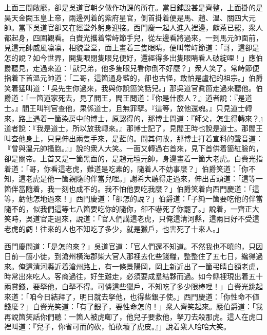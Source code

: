 上面三間敞廳，卻是吳道官朝夕做作功課的所在。當日鋪設甚是齊整，上面掛的是昊天金闕玉皇上帝，兩邊列着的紫府星官，側首掛着便是馬、趙、溫、關四大元帥。{}當下吳道官卻又在經堂外躬身迎接。西門慶一起人進入裡邊，獻茶已罷，衆人都起身，四圍觀看。白賚光攜着常峙節手兒，從左邊看將過來，一到馬元帥面前，見這元帥威風凜凜，相貌堂堂，面上畫着三隻眼睛，便叫常峙節道：「哥，這卻是怎的說？如今世界，開隻眼閉隻眼兒便好，還經得多出隻眼睛看人破綻哩！」應伯爵聽見，走過來道：「獃兄弟，他多隻眼兒看你倒不好麼？」{}衆人笑了。常峙節便指着下首溫元帥道：「二哥，這箇通身藍的，卻也古怪，敢怕是盧杞的祖宗。」伯爵笑着猛叫道：「吳先生你過來，我與你說箇笑話兒。」那吳道官眞箇走過來聽他。伯爵道：「一箇道家死去，見了閻王，閻王問道：『你是什麼人？』道者說：『是道士。』閻王叫判官查他，果係道士，且無罪孽。『這等，放他還魂。』只見道士轉來，路上遇着一箇染房中的博士，原認得的，那博士問道：『師父，怎生得轉來？』道者說：『我是道士，所以放我轉來。』那博士記了，見閻王時也說是道士。那閻王叫查他身上，只見伸出兩隻手來，是藍的。問其何故，那博士打着宣科的聲音道：『曾與溫元帥搔胞。』」說的衆人大笑。一面又轉過右首來，見下首供着箇紅臉的，卻是關帝。上首又是一箇黑面的，是趙元壇元帥，身邊畫着一箇大老虎。白賚光指着道：「哥，你看這老虎，難道是吃素的，隨着人不妨事麼？」伯爵笑道：「你不知，這老虎是他一箇親隨的伴當兒哩。」謝希大聽得走過來，伸出舌頭道：「這等一箇伴當隨着，我一刻也成不的。我不怕他要吃我麼？」伯爵笑着向西門慶道：「這等，虧他怎地過來！」西門慶道：「卻怎的說？」伯爵道：「子純一箇要吃他的伴當隨不的，似我們這等七八箇要吃你的隨你，卻不嚇死了你罷了。」{}說着，一齊正大笑時，吳道官走過來，說道：「官人們講這老虎，{}只俺這清河縣，這兩日好不受這老虎的虧！往來的人也不知吃了多少，就是獵戶，也害死了十來人。」

西門慶問道：「是怎的來？」吳道官道：「官人們還不知道。不然我也不曉的，只因日前一箇小徒，到滄州橫海郡柴大官人那裡去化些錢糧，{}整整住了五七日，纔得過來。俺這清河縣近着滄州路上，有一條景陽岡，岡上新近出了一箇弔睛白額老虎，時常出來吃人。客商過往，好生難走，必須要成羣結夥而過。如今縣裡現出着五十兩賞錢，要拏他，白拏不得。可憐這些獵戶，不知吃了多少限棒哩！」白賚光跳起來道：「咱今日結拜了，明日就去拏他，也得些銀子使。」西門慶道：「你性命不値錢麼？」白賚光笑道：「有了銀子，要性命怎的！」衆人齊笑起來。應伯爵道：「我再說箇笑話你們聽：一箇人被虎啣了，他兒子要救他，拏刀去殺那虎。這人在虎口裡叫道：『兒子，你省可而的砍，怕砍壞了虎皮。』」{}說着衆人哈哈大笑。

